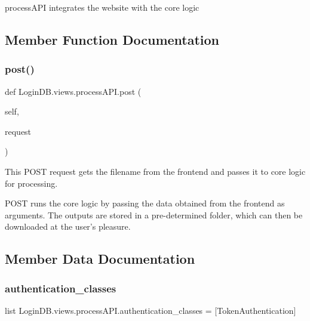 \begin{DoxyVerb}processAPI integrates the website with the core logic
\end{DoxyVerb}
 

\subsection{Member Function Documentation}
\mbox{\label{class_login_d_b_1_1views_1_1process_a_p_i_abf9247305b4cc3b1a22dbdb2e8a30d38}} 
\subsubsection{\texorpdfstring{post()}{post()}}
{\footnotesize\ttfamily def Login\+D\+B.\+views.\+process\+A\+P\+I.\+post (\begin{DoxyParamCaption}\item[{}]{self,  }\item[{}]{request }\end{DoxyParamCaption})}



This P\+O\+ST request gets the filename from the frontend and passes it to core logic for processing. 

\begin{DoxyVerb}POST runs the core logic by passing the data obtained from the frontend as arguments.
The outputs are stored in a pre-determined folder, which can then be downloaded at the user's pleasure.
\end{DoxyVerb}
 

\subsection{Member Data Documentation}
\mbox{\label{class_login_d_b_1_1views_1_1process_a_p_i_a0c949077031dc342e5763bb8dfdefcd4}} 
\subsubsection{\texorpdfstring{authentication\+\_\+classes}{authentication\_classes}}
{\footnotesize\ttfamily list Login\+D\+B.\+views.\+process\+A\+P\+I.\+authentication\+\_\+classes = \mbox{[}Token\+Authentication\mbox{]}\hspace{0.3cm}{\ttfamily [static]}}

